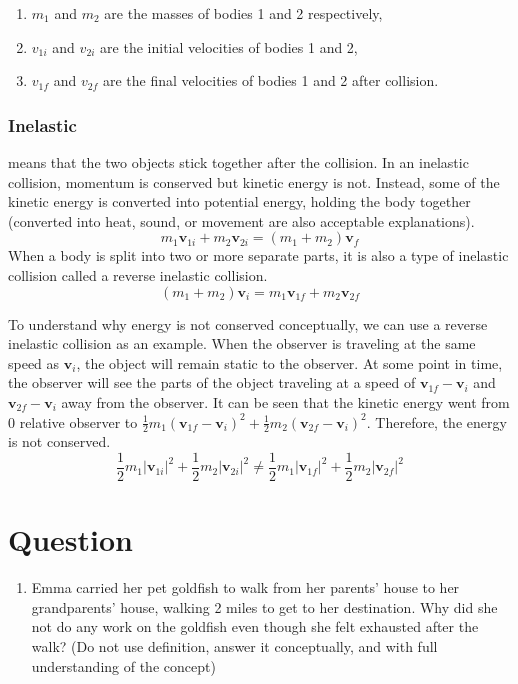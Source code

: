 \documentclass[]{article}
\begin{document}
\begin{enumerate}
\item $m_1$ and $m_2$ are the masses of bodies 1 and 2 respectively,

\item $v_{1i}$ and $v_{2i}$ are the initial velocities of bodies 1 and 2,

\item $v_{1f}$ and $v_{2f}$ are the final velocities of bodies 1 and 2 after collision.
  
\end{enumerate}
\subsubsection{Inelastic} means that the two objects stick together after the collision.
In an inelastic collision, momentum is conserved but kinetic energy is not.
Instead, some of the kinetic energy is converted into potential energy, holding the body together (converted into heat,
sound, or movement are also acceptable explanations).
\[m_1 \mathbf{v}_{1i} + m_2 \mathbf{v}_{2i} = (m_1 +m_2)\mathbf{v}_{f}\]
When a body is split into two or more separate parts, it is also a type of inelastic collision called a reverse inelastic collision.
\[(m_1 +m_2)\mathbf{v}_{i} = m_1 \mathbf{v}_{1f} + m_2 \mathbf{v}_{2f} \]

To understand why energy is not conserved conceptually, we can use a reverse inelastic collision as an example.
When the observer is traveling at the same speed as $\mathbf{v}_{i}$, the object will remain static to the observer.
At some point in time, the observer will see the parts of the object traveling at a speed of $\mathbf{v}_{1f} -\mathbf{v}_{i}$ and  $\mathbf{v}_{2f} -\mathbf{v}_{i}$ away from the observer.
It can be seen that the kinetic energy went from $0$ relative observer to $\frac{1}{2} m_1(\mathbf{v}_{1f} -\mathbf{v}_{i})^2 + \frac{1}{2} m_2 (\mathbf{v}_{2f} -\mathbf{v}_{i})^2$.
Therefore, the energy is not conserved.
\[\frac{1}{2} m_1 |\mathbf{v}_{1i}|^2 + \frac{1}{2} m_2 |\mathbf{v}_{2i}|^2 \neq \frac{1}{2} m_1 |\mathbf{v}_{1f}|^2 + \frac{1}{2} m_2 |\mathbf{v}_{2f}|^2\]


\section{Question}\label{sec:question}
\begin{enumerate}
	\item Emma carried her pet goldfish to walk from her parents' house to her grandparents' house, walking 2 miles to get to her destination.
	Why did she not do any work on the goldfish even though she felt exhausted after the walk?
	(Do not use definition, answer it conceptually, and with full understanding of the concept)
\end{enumerate}
\end{document}
